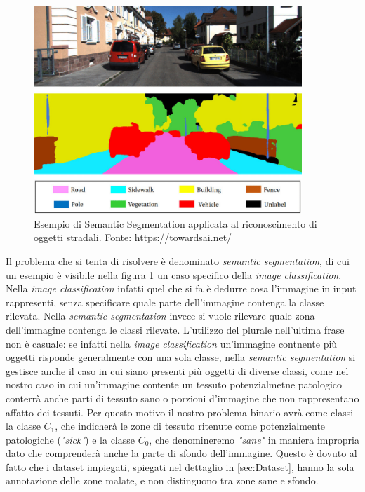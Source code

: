 \begin{figure}
    \center
    \includegraphics[width=0.9\textwidth]{./assets/semseg.jpg}
    \caption{\label{fig:semseg}Esempio di Semantic Segmentation applicata 
    al riconoscimento di oggetti stradali. 
    Fonte: https://towardsai.net/}
\end{figure}

Il problema che si tenta di risolvere è denominato
{\it semantic segmentation}, di cui un esempio è visibile nella figura 
\ref{fig:semseg} un caso specifico della {\it image classification}.
Nella {\it image classification} infatti quel che si fa è dedurre cosa l'immagine
in input rappresenti, senza specificare quale parte dell'immagine contenga la classe
rilevata.
Nella {\it semantic segmentation} invece si vuole rilevare quale zona dell'immagine
contenga le classi rilevate. 
L'utilizzo del plurale nell'ultima frase non è casuale: se infatti nella {\it image classification}
un'immagine contnente più oggetti risponde generalmente con una sola classe,
nella {\it semantic segmentation} si gestisce anche il caso in cui siano presenti più
oggetti di diverse classi, come nel nostro caso in cui un'immagine contente un
tessuto potenzialmetne patologico conterrà anche parti di tessuto sano o
porzioni d'immagine che non rappresentano affatto dei tessuti.
Per questo motivo il nostro problema binario avrà come classi la classe $C_1$, che indicherà
le zone di tessuto ritenute come potenzialmente patologiche ({\it "sick"}) e la classe $C_0$,
che denomineremo {\it "sane"} in maniera impropria dato che comprenderà
anche la parte di sfondo dell'immagine.
Questo è dovuto al fatto che i dataset impiegati, spiegati nel dettaglio in 
\ref{sec:Dataset}, hanno la sola annotazione delle zone malate, e non distinguono tra
zone sane e sfondo.


